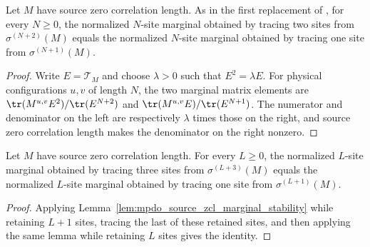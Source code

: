 \begin{lemma}
    \label{lem:mpdo_source_zcl_marginal_stability}
    \leanok
    Let $M$ have source zero correlation length. As in the first replacement of
    \cite[Appendix~C.2, line~1613]{Cirac2016MPDO_arXiv}, for every $N\geq0$, the
    normalized $N$-site marginal obtained by tracing two sites from
    $\sigma^{(N+2)}(M)$ equals the normalized $N$-site marginal obtained by
    tracing one site from $\sigma^{(N+1)}(M)$.
\end{lemma}

\begin{proof}\leanok
    Write $E=\mathcal T_M$ and choose $\lambda>0$ such that
    $E^2=\lambda E$. For physical configurations $u,v$ of length $N$, the
    two marginal matrix elements are
    $\tr(M^{u,v}E^2)/\tr(E^{N+2})$ and
    $\tr(M^{u,v}E)/\tr(E^{N+1})$.
    The numerator and denominator on the left are respectively $\lambda$
    times those on the right, and source zero correlation length makes the
    denominator on the right nonzero.
\end{proof}

\begin{lemma}
    \label{thm:mpdo_source_zcl_iterated_marginal_stability}
    \leanok
    Let $M$ have source zero correlation length. For every $L\geq0$, the
    normalized $L$-site marginal obtained by tracing three sites from
    $\sigma^{(L+3)}(M)$ equals the normalized $L$-site marginal obtained by
    tracing one site from $\sigma^{(L+1)}(M)$.
\end{lemma}

\begin{proof}\leanok
    Applying Lemma~\ref{lem:mpdo_source_zcl_marginal_stability} while
    retaining $L+1$ sites, tracing the last of these retained sites, and
    then applying the same lemma while retaining $L$ sites gives the
    identity.
\end{proof}

